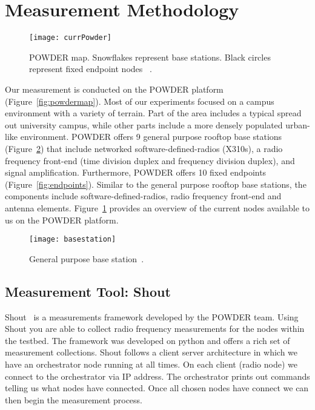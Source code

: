 

\section{Measurement Methodology}
\label{sec:methodology}

\begin{figure}
  \centering
  \texttt{[image: currPowder]}
  \caption{POWDER map. Snowflakes represent base stations. Black circles represent fixed endpoint nodes ~\cite{Breen+:wintech20}.}
  \label{fig:powdernodes}
\end{figure}

Our measurement is conducted on the POWDER platform (Figure~\ref{fig:powdermap}). Most of our experiments focused on a campus
environment with a variety of terrain. Part of the area includes a typical spread out university campus, while other parts include a more densely 
populated urban-like environment. POWDER offers 9 general purpose rooftop base stations (Figure~\ref{fig:basestat}) that include networked software-defined-radios (X310s), a radio frequency front-end (time division duplex and frequency division duplex), and signal 
amplification. Furthermore, POWDER offers 10 fixed endpoints (Figure~\ref{fig:endpoints}). Similar to the general purpose rooftop base 
stations, the components include software-defined-radios, radio frequency front-end and antenna elements. Figure~\ref{fig:powdernodes} 
provides an overview of the current nodes available to us on the POWDER platform.

\begin{figure}
  \centering
  \texttt{[image: basestation]}
  \caption{General purpose base station~\cite{Breen+:wintech20}.}
  \label{fig:basestat}
\end{figure}

\subsection*{Measurement Tool: Shout}

Shout~\cite{shout} is a measurements framework developed by the POWDER team. Using Shout you are able to collect radio frequency
measurements for the nodes within the testbed. The framework was developed on python and offers a rich set of measurement collections.
Shout follows a client server architecture in which we have an orchestrator node running at all times. On each client (radio node) we 
connect to the orchestrator via IP address. The orchestrator prints out commands telling us what nodes have connected. Once all chosen 
nodes have connect we can then begin the measurement process. 

